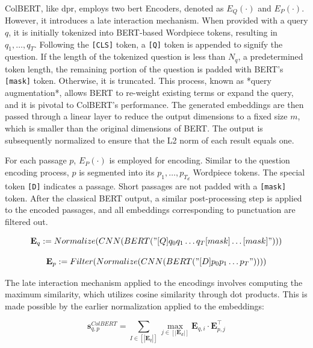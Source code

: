 ColBERT, like \gls{dpr}, employs two \gls{bert} Encoders, denoted as $E_Q\left(\cdot\right)$ and $E_P\left(\cdot\right)$. However, it introduces a late interaction mechanism. When provided with a query $q$, it is initially tokenized into BERT-based Wordpiece tokens, resulting in $q_1, \ldots, q_T$. Following the \verb|[CLS]| token, a \verb|[Q]| token is appended to signify the question. If the length of the tokenized question is less than $N_q$, a predetermined token length, the remaining portion of the question is padded with BERT's \verb|[mask]| token. Otherwise, it is truncated. This process, known as *query augmentation*, allows BERT to re-weight existing terms or expand the query, and it is pivotal to ColBERT's performance. The generated embeddings are then passed through a linear layer to reduce the output dimensions to a fixed size $m$, which is smaller than the original dimensions of BERT. The output is subsequently normalized to ensure that the L2 norm of each result equals one.

For each passage $p$, $E_P\left(\cdot\right)$ is employed for encoding. Similar to the question encoding process, $p$ is segmented into its $p_1, \ldots, p_{T_d}$ Wordpiece tokens. The special token \verb|[D]| indicates a passage. Short passages are not padded with a \verb|[mask]| token. After the classical BERT output, a similar post-processing step is applied to the encoded passages, and all embeddings corresponding to punctuation are filtered out.

\begin{equation}
    \mathbf{E}_{q}:= Normalize(CNN(BERT("[Q] q_0 q_1 \dots q_T [mask] \dots [mask]")))
\end{equation}

\begin{equation}
    \mathbf{E}_{p}:= Filter(Normalize(CNN(BERT("[D]p_0 p_1 \dots p_T"))))
\end{equation}

The late interaction mechanism applied to the encodings involves computing the maximum similarity, which utilizes cosine similarity through dot products. This is made possible by the earlier normalization applied to the embeddings:

\begin{equation}
    \mathbf{s}_{q, p}^{C o l B E R T}=\sum_{I\in\left[\left|\mathbf{E}_q\right|\right]}\max _{j\in\left[\left|\mathbf{E}_d\right|\right]} \mathbf{E}_{q, i} \cdot \mathbf{E}_{p, j}^{\top}
\end{equation}

